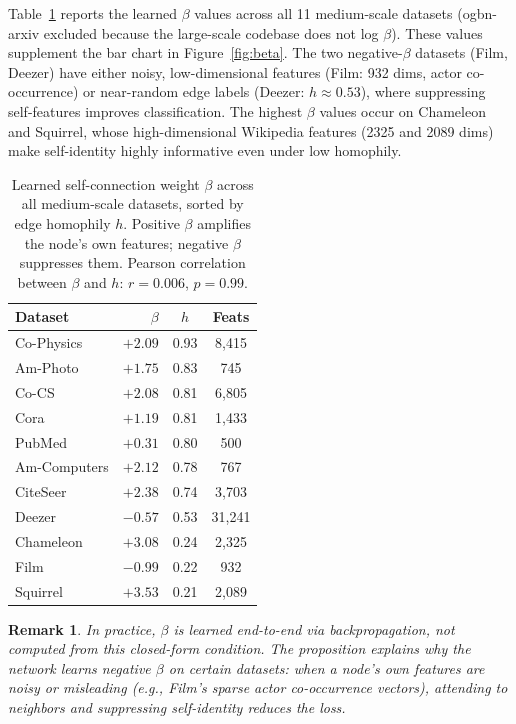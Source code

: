 \documentclass[sigconf]{acmart}
\newtheorem{remark}{Remark}
\begin{document}
Table~\ref{tab:beta_values} reports the learned $\beta$ values across all 11 medium-scale datasets (ogbn-arxiv excluded because the large-scale codebase does not log $\beta$). These values supplement the bar chart in Figure~\ref{fig:beta}. The two negative-$\beta$ datasets (Film, Deezer) have either noisy, low-dimensional features (Film: 932 dims, actor co-occurrence) or near-random edge labels (Deezer: $h \approx 0.53$), where suppressing self-features improves classification. The highest $\beta$ values occur on Chameleon and Squirrel, whose high-dimensional Wikipedia features (2325 and 2089 dims) make self-identity highly informative even under low homophily.

\begin{table}[H]
\centering
\small
\begin{tabular}{l|rcc}
\toprule
\textbf{Dataset} & $\beta$ & $h$ & \textbf{Feats} \\
\midrule
Co-Physics   & $+2.09$ & 0.93 & 8,415 \\
Am-Photo     & $+1.75$ & 0.83 & 745 \\
Co-CS        & $+2.08$ & 0.81 & 6,805 \\
Cora         & $+1.19$ & 0.81 & 1,433 \\
PubMed       & $+0.31$ & 0.80 & 500 \\
Am-Computers & $+2.12$ & 0.78 & 767 \\
CiteSeer     & $+2.38$ & 0.74 & 3,703 \\
\midrule
Deezer       & $-0.57$ & 0.53 & 31,241 \\
Chameleon    & $+3.08$ & 0.24 & 2,325 \\
Film         & $-0.99$ & 0.22 & 932 \\
Squirrel     & $+3.53$ & 0.21 & 2,089 \\
\bottomrule
\end{tabular}
\caption{Learned self-connection weight $\beta$ across all medium-scale datasets, sorted by edge homophily $h$. Positive $\beta$ amplifies the node's own features; negative $\beta$ suppresses them. Pearson correlation between $\beta$ and $h$: $r = 0.006$, $p = 0.99$.}
\label{tab:beta_values}
\end{table}

\begin{remark}
In practice, $\beta$ is learned end-to-end via backpropagation, not computed from this closed-form condition. The proposition explains \emph{why} the network learns negative $\beta$ on certain datasets: when a node's own features are noisy or misleading (e.g., Film's sparse actor co-occurrence vectors), attending to neighbors and suppressing self-identity reduces the loss.
\end{remark}
\end{document}
